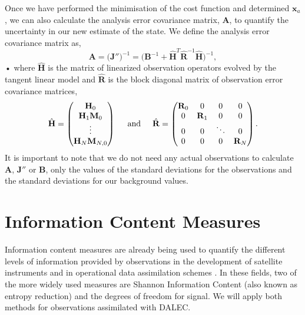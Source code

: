 \documentclass[11pt]{article}
\begin{document}
Once we have performed the minimisation of the cost function and determined $\textbf{x}_a$, we can also calculate the analysis error covariance matrix, $\textbf{A}$, to quantify the uncertainty in our new estimate of the state. We define the analysis error covariance matrix as,
\begin{equation}
\textbf{A} = \big(\mathbf{J}''\big)^{-1} = \big(\mathbf{B}^{-1}+\hat{\mathbf{H}}^{T}\hat{\mathbf{R}}^{-1}\hat{\textbf{H}}\big)^{-1}, \label{Amat}
\end{equation}• 
where $\hat{\mathbf{H}}$ is the matrix of linearized observation operators evolved by the tangent linear model and $\hat{\mathbf{R}}$ is the block diagonal matrix of observation error covariance matrices,
\begin{equation}
\hat{\mathbf{H}}=
\begin{pmatrix}
\mathbf{H}_0 \\
\mathbf{H}_1\mathbf{M}_0\\
\vdots \\
\mathbf{H}_N\mathbf{M}_{N,0}
\end{pmatrix}
\hspace{5mm} \text{and} \hspace{5mm}
\hat{\mathbf{R}}=
\begin{pmatrix}
\mathbf{R}_0 & 0 & 0 & 0 \\
0 & \mathbf{R}_1 & 0 & 0 \\
0 & 0 & \ddots & 0 \\
0 & 0 & 0 & \mathbf{R}_N
\end{pmatrix}.
\end{equation}
It is important to note that we do not need any actual observations to calculate $\textbf{A}$, $\textbf{J}''$ or $\textbf{B}$, only the values of the standard deviations for the observations and the standard deviations for our background values.  

\section{Information Content Measures}%

Information content measures are already being used to quantify the different levels of information provided by observations in the development of satellite instruments \cite{stewart2008correlated, engelen2004information} and in operational data assimilation schemes \cite{fisher2003estimation, sandu2012practical}. In these fields, two of the more widely used measures are Shannon Information Content (also known as entropy reduction) and the degrees of freedom for signal. We will apply both methods for observations assimilated with DALEC. 
\end{document}
